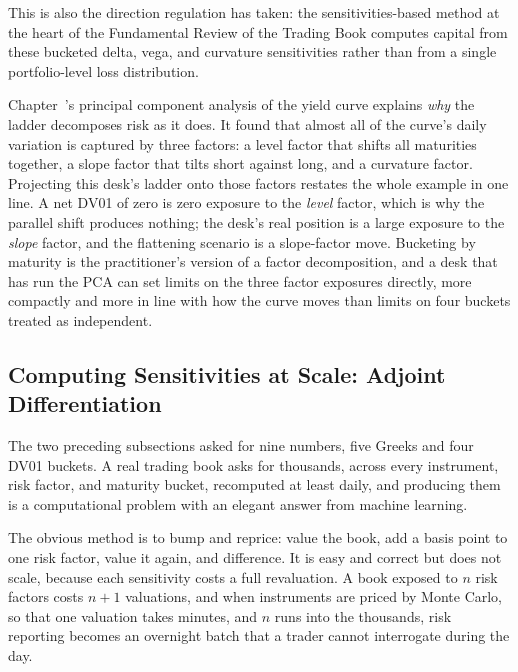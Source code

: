 \documentclass[../ai_in_finance]{subfiles}
\begin{document}
This is also the direction regulation has taken: the sensitivities-based method at the heart of the Fundamental Review of the Trading Book computes capital from these bucketed delta, vega, and curvature sensitivities rather than from a single portfolio-level loss distribution.

Chapter~'s principal component analysis of the yield curve explains \emph{why} the ladder decomposes risk as it does. It found that almost all of the curve's daily variation is captured by three factors: a level factor that shifts all maturities together, a slope factor that tilts short against long, and a curvature factor. Projecting this desk's ladder onto those factors restates the whole example in one line. A net DV01 of zero is zero exposure to the \emph{level} factor, which is why the parallel shift produces nothing; the desk's real position is a large exposure to the \emph{slope} factor, and the flattening scenario is a slope-factor move. Bucketing by maturity is the practitioner's version of a factor decomposition, and a desk that has run the PCA can set limits on the three factor exposures directly, more compactly and more in line with how the curve moves than limits on four buckets treated as independent.

\subsection{Computing Sensitivities at Scale: Adjoint Differentiation}
\label{sec:aad}

The two preceding subsections asked for nine numbers, five Greeks and four DV01 buckets. A real trading book asks for thousands, across every instrument, risk factor, and maturity bucket, recomputed at least daily, and producing them is a computational problem with an elegant answer from machine learning.

The obvious method is to bump and reprice: value the book, add a basis point to one risk factor, value it again, and difference. It is easy and correct but does not scale, because each sensitivity costs a full revaluation. A book exposed to $n$ risk factors costs $n+1$ valuations, and when instruments are priced by Monte Carlo, so that one valuation takes minutes, and $n$ runs into the thousands, risk reporting becomes an overnight batch that a trader cannot interrogate during the day.
\end{document}

